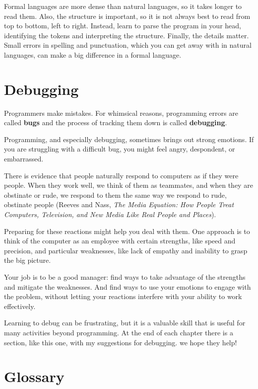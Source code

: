 Formal languages are more dense
than natural languages, so it takes longer to read them. Also, the
structure is important, so it is not always best to read
from top to bottom, left to right. Instead, learn to parse the
program in your head, identifying the tokens and interpreting the
structure. Finally, the details matter. Small errors in
spelling and punctuation, which you can get away
with in natural languages, can make a big difference in a formal
language.


\section{Debugging}

Programmers make mistakes. For whimsical reasons, programming errors
are called {\bf bugs} and the process of tracking them down is called
{\bf debugging}.

Programming, and especially debugging, sometimes brings out strong
emotions. If you are struggling with a difficult bug, you might 
feel angry, despondent, or embarrassed.

There is evidence that people naturally respond to computers as if
they were people. When they work well, we think
of them as teammates, and when they are obstinate or rude, we
respond to them the same way we respond to rude,
obstinate people (Reeves and Nass, {\it The Media
    Equation: How People Treat Computers, Television, and New Media
    Like Real People and Places}).

Preparing for these reactions might help you deal with them.
One approach is to think of the computer as an employee with
certain strengths, like speed and precision, and
particular weaknesses, like lack of empathy and inability
to grasp the big picture.

Your job is to be a good manager: find ways to take advantage
of the strengths and mitigate the weaknesses. And find ways
to use your emotions to engage with the problem,
without letting your reactions interfere with your ability
to work effectively.

Learning to debug can be frustrating, but it is a valuable skill
that is useful for many activities beyond programming. At the
end of each chapter there is a section, like this one,
with my suggestions for debugging. we hope they help!


\section{Glossary}

